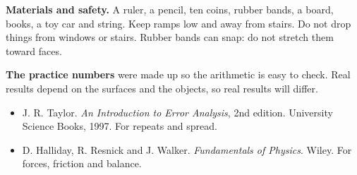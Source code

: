 \textbf{Materials and safety.} A ruler, a pencil, ten coins, rubber bands, a board, books, a toy car and string. Keep ramps low and away from stairs. Do not drop things from windows or stairs. Rubber bands can snap: do not stretch them toward faces.

\textbf{The practice numbers} were made up so the arithmetic is easy to check. Real results depend on the surfaces and the objects, so real results will differ.

\begin{itemize}[leftmargin=1.3em,itemsep=0.2em]
\item J. R. Taylor. \emph{An Introduction to Error Analysis}, 2nd edition. University Science Books, 1997. For repeats and spread.
\item D. Halliday, R. Resnick and J. Walker. \emph{Fundamentals of Physics}. Wiley. For forces, friction and balance.
\end{itemize}

\clearpage
\thispagestyle{blank}

